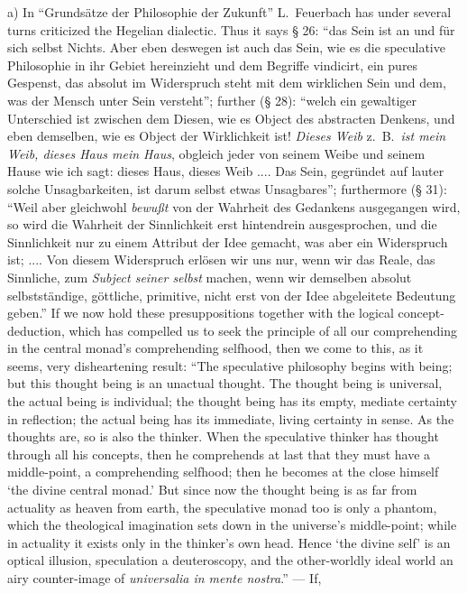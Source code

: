 \documentclass[12pt]{book}
\begin{document}
a) In ``Grundsätze der Philosophie der Zukunft'' L.\ Feuerbach has under
several turns criticized the Hegelian dialectic. Thus it says § 26: ``das
Sein ist an und für sich selbst Nichts. Aber eben deswegen ist auch das
Sein, wie es die speculative Philosophie in ihr Gebiet hereinzieht und dem
Begriffe vindicirt, ein pures Gespenst, das absolut im Widerspruch steht mit
dem wirklichen Sein und dem, was der Mensch unter Sein versteht''; further
(§ 28): ``welch ein gewaltiger Unterschied ist zwischen dem Diesen, wie es
Object des abstracten Denkens, und eben demselben, wie es Object der
Wirklichkeit ist! \emph{Dieses Weib} z.\ B.\ \emph{ist mein Weib, dieses
Haus mein Haus}, obgleich jeder von seinem Weibe und seinem Hause wie ich
sagt: dieses Haus, dieses Weib .... Das Sein, gegründet auf lauter solche
Unsagbarkeiten, ist darum selbst etwas Unsagbares''; furthermore (§ 31):
``Weil aber gleichwohl \emph{bewußt} von der Wahrheit des Gedankens
ausgegangen wird, so wird die Wahrheit der Sinnlichkeit erst hintendrein
ausgesprochen, und die Sinnlichkeit nur zu einem Attribut der Idee gemacht,
was aber ein Widerspruch ist; .... Von diesem Widerspruch erlösen wir uns
nur, wenn wir das Reale, das Sinnliche, zum \emph{Subject seiner selbst}
machen, wenn wir demselben absolut selbstständige, göttliche, primitive,
nicht erst von der Idee abgeleitete Bedeutung geben.'' If we now hold these
presuppositions together with the logical concept-deduction, which has
compelled us to seek the principle of all our comprehending in the central
monad's comprehending selfhood, then we come to this, as it seems, very
disheartening result: ``The speculative philosophy begins with being; but
this thought being is an unactual thought. The thought being is universal,
the actual being is individual; the thought being has its empty, mediate
certainty in reflection; the actual being has its immediate, living
certainty in sense. As the thoughts are, so is also the thinker. When the
speculative thinker has thought through all his concepts, then he
comprehends at last that they must have a middle-point, a comprehending
selfhood; then he becomes at the close himself `the divine central monad.'
But since now the thought being is as far from actuality as heaven from
earth, the speculative monad too is only a phantom, which the theological
imagination sets down in the universe's middle-point; while in actuality it
exists only in the thinker's own head. Hence `the divine self' is an optical
illusion, speculation a deuteroscopy, and the other-worldly ideal world an
airy counter-image of \textit{universalia in mente nostra}.'' --- If,
\end{document}
